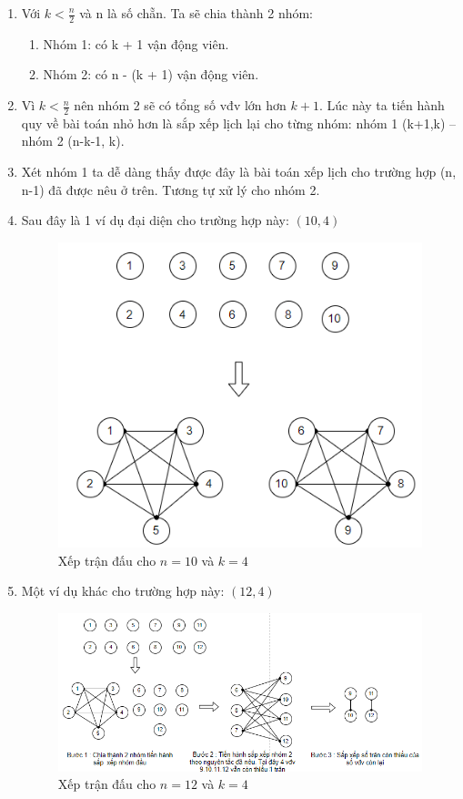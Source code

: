 \documentclass[13pt,a4paper]{article}
\begin{document}
\begin{enumerate}
	 \newpage
	 \item Với $k < \frac{n}{2}$ và n là số chẵn. Ta sẽ chia thành 2 nhóm:
	 \begin{enumerate}
	 	\item Nhóm 1: có k + 1 vận động viên.
	 	\item Nhóm 2: có n - (k + 1) vận động viên.
	 \end{enumerate}
	 \item[] Vì $k < \frac{n}{2}$ nên nhóm 2 sẽ có tổng số vđv lớn hơn $k + 1$. Lúc này ta tiến hành quy về bài toán nhỏ hơn là sắp xếp lịch lại cho từng nhóm: nhóm 1 (k+1,k) -- nhóm 2 (n-k-1, k).
	 \item[] Xét nhóm 1 ta dễ dàng thấy được đây là bài toán xếp lịch cho trường hợp (n, n-1) đã được nêu ở trên. Tương tự xử lý cho nhóm 2.
	 \item[] Sau đây là 1 ví dụ đại diện cho trường hợp này: $(10, 4)$
	 \begin{figure}[H]
	 	\centering
	 	\includegraphics[scale=0.7]{./image/ex1_nho.png}
	 	\caption{Xếp trận đấu cho $n = 10$ và $k = 4$}
	 \end{figure}
	 \item[]Một ví dụ khác cho trường hợp này: $(12, 4)$
	 \begin{figure}[H]
	 	\centering
	 	\includegraphics[scale=0.7]{./image/ex2_nho.png}
	 	\caption{Xếp trận đấu cho $n = 12$ và $k = 4$}
	 \end{figure}
	 

\end{enumerate}
\end{document}
